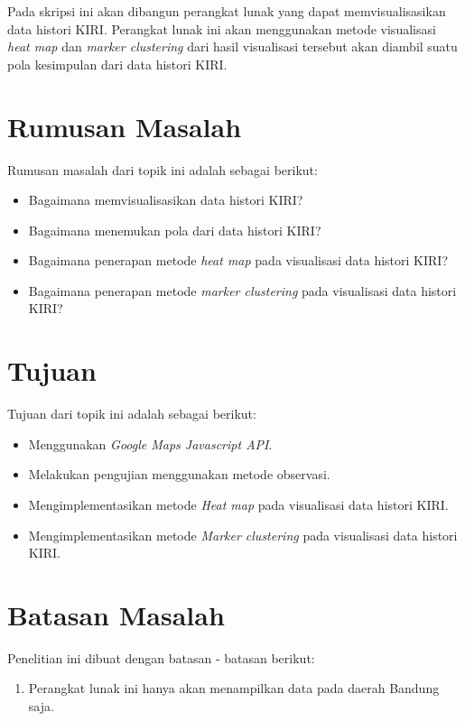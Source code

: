 Pada skripsi ini akan dibangun perangkat lunak yang dapat memvisualisasikan data histori KIRI. Perangkat lunak ini akan menggunakan metode visualisasi \textit{heat map} dan \textit{marker clustering} dari hasil visualisasi tersebut akan diambil suatu pola kesimpulan dari data histori KIRI.


\section{Rumusan Masalah}
\label{sec:rumusan}
Rumusan masalah dari topik ini adalah sebagai berikut:
\begin{itemize}
  \item Bagaimana memvisualisasikan data histori KIRI?
  \item Bagaimana menemukan pola dari data histori KIRI?
  \item Bagaimana penerapan metode \textit{heat map} pada visualisasi data histori KIRI?
  \item Bagaimana penerapan metode \textit{marker clustering} pada visualisasi data histori KIRI?
\end{itemize}

\section{Tujuan}
\label{sec:tujuan}
Tujuan dari topik ini adalah sebagai berikut:
\begin{itemize}
  \item Menggunakan \textit{Google Maps Javascript API}.
  \item Melakukan pengujian menggunakan metode observasi.
  \item Mengimplementasikan metode \textit{Heat map} pada visualisasi data histori KIRI.
  \item Mengimplementasikan metode \textit{Marker clustering} pada visualisasi data histori KIRI.
\end{itemize}

\section{Batasan Masalah}
\label{sec:batasan}
Penelitian ini dibuat dengan batasan - batasan berikut:
\begin{enumerate}
	\item Perangkat lunak ini hanya akan menampilkan data pada daerah Bandung saja.
\end{enumerate}



